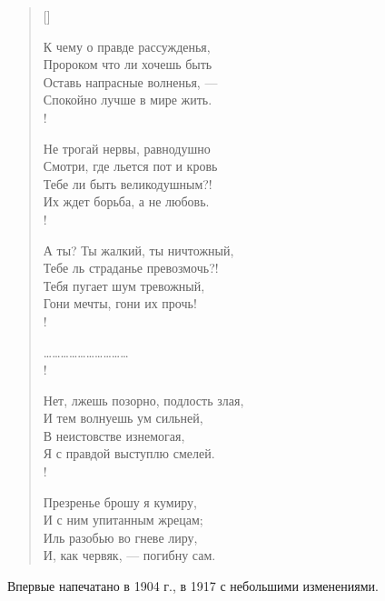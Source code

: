 \newpage
\vspace*{0cm}

\newpage
\vspace*{-0.5cm}
 
\settowidth{\versewidth}{А ты? Ты жалкий, ты ничтожный,}
\begin{verse}[\versewidth]
\begin{altverse}
К чему о правде рассужденья,\\ 
Пророком что ли хочешь быть\ldotse\\
Оставь напрасные волненья, ---\\
Спокойно лучше в мире жить.\\!

Не трогай нервы, равнодушно\\
Смотри, где льется пот и кровь\ldotst\\
Тебе ли быть великодушным?!\\
Их ждет борьба, а не любовь.\\!

А ты? Ты жалкий, ты ничтожный,\\
Тебе ль страданье превозмочь?!\\
Тебя пугает шум тревожный,\\
Гони мечты, гони их прочь!\\!
\end{altverse}
\vin\ldots\ldots\ldots\ldots\ldots\ldots\ldots\ldots\ldots\ldots\\!
\begin{altverse}
Нет, лжешь позорно, подлость злая,\\
И тем волнуешь ум сильней,\\
В неистовстве изнемогая,\\
Я с правдой выступлю смелей.\\!

Презренье брошу я кумиру,\\
И с ним упитанным жрецам;\\
Иль разобью во гневе лиру,\\
И, как червяк, --- погибну сам.
\end{altverse}
\end{verse}
Впервые напечатано в 1904 г., в 1917 с небольшими изменениями.

\newpage
\vspace*{0cm}



